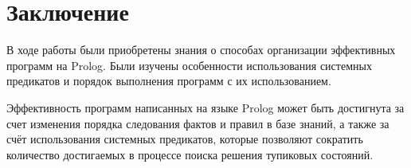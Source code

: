\clearpage

{\large\section*{Заключение}}

В ходе работы были приобретены знания о способах организации эффективных программ на Prolog. Были изучены особенности использования системных предикатов и порядок выполнения программ с их использованием.

Эффективность программ написанных на языке Prolog может быть достигнута за счет изменения порядка следования фактов и правил в базе знаний, а также за счёт использования системных предикатов, которые позволяют сократить количество достигаемых в процессе поиска решения тупиковых состояний. 
